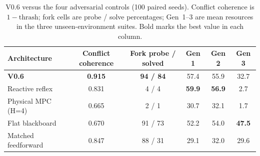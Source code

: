 \documentclass{article}
\begin{document}
\begin{table}[t]
\centering
\small
\caption{V0.6 versus the four adversarial controls (100 paired seeds). Conflict coherence is $1-\text{thrash}$; fork cells are probe / solve percentages; Gen~1--3 are mean resources in the three unseen-environment suites. Bold marks the best value in each column.}
\label{tab:controls}
\begin{tabular}{lccccc}
\toprule
Architecture & Conflict coherence & Fork probe / solved & Gen 1 & Gen 2 & Gen 3 \\
\midrule
\textbf{V0.6} & \textbf{0.915} & \textbf{94 / 84} & 57.4 & 55.9 & 32.7 \\
Reactive reflex & 0.831 & 4 / 4 & \textbf{59.9} & \textbf{56.9} & 2.7 \\
Physical MPC (H=4) & 0.665 & 2 / 1 & 30.7 & 32.1 & 1.7 \\
Flat blackboard & 0.670 & 91 / 73 & 52.2 & 54.0 & \textbf{47.5} \\
Matched feedforward & 0.847 & 88 / 31 & 29.1 & 32.0 & 29.6 \\
\bottomrule
\end{tabular}
\end{table}

\begin{table}[t]
\centering
\small
\caption{Full $6\times5$ crossed ablation matrix at 100 paired seeds. Cells are Cohen's $d_z$ for the primary contrast (Exp~1 absorption, Exp~2 coherence, Exp~4 fork solved, Exp~5 detection latency) and four-way attribution macro-F1 for Exp~3; $^{*}$ marks Holm-adjusted $p<0.05$. Positive values mean the intact architecture is higher on that metric; negative values mean the ablation is higher.}
\label{tab:crossed}
\end{table}
\end{document}
